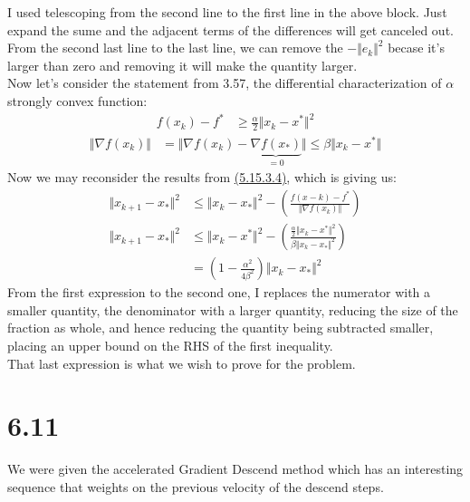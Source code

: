 \documentclass[]{article}
\begin{document}
    I used telescoping from the second line to the first line in the above block. Just expand the sume and the adjacent terms of the differences will get canceled out. 
    \\[1.1em]
    From the second last line to the last line, we can remove the $-\Vert e_k\Vert^2$ becase it's larger than zero and removing it will make the quantity larger. 
    \\[1.1em]
    Now let's consider the statement from 3.57, the differential characterization of $\alpha$ strongly convex function: 
    \begin{align*}\tag{5.15.3.5}\label{eqn:5.15.3.5}
        f(x_k) - f^* &\ge \frac{\alpha}{2}\Vert x_k - x^*\Vert^2
    \end{align*}
    \begin{align*}\tag{5.15.3.6}\label{eqn:5.15.3.6}
        \Vert \nabla f(x_k)\Vert &= 
        \Vert \nabla f(x_k) - \underbrace{\nabla f(x_*)}_{=0}\Vert \le \beta \Vert x_k - x^*\Vert
    \end{align*}
    Now we may reconsider the results from \hyperref[eqn:5.15.3.4]{(5.15.3.4)}, which is giving us: 
    \begin{align*}\tag{5.15.3.7}\label{eqn:5.15.3.7}
        \Vert x_{k + 1} - x_*\Vert^2 &\le 
        \Vert x_k - x_*\Vert^2 - 
        \left(
            \frac{f(x-k) - f^*}{\Vert \nabla f(x_k)\Vert}
        \right)
        \\
        \Vert x_{k + 1} - x_*\Vert^2 &\le 
        \Vert x_k - x^*\Vert^2 - 
        \left(
            \frac{\frac{\alpha}{2}\Vert x_k - x^*\Vert^2}{
                \beta \Vert x_k - x_*\Vert^2
            }
        \right)
        \\
        &= 
        \left(
            1 - \frac{\alpha^2}{4\beta^2}
        \right)\Vert x_k - x_*\Vert^2
    \end{align*}
    From the first expression to the second one, I replaces the numerator with a smaller quantity, the denominator with a larger quantity, reducing the size of the fraction as whole, and hence reducing the quantity being subtracted smaller, placing an upper bound on the RHS of the first inequality. 
    \\[1.1em]
    That last expression is what we wish to prove for the problem. 
\section*{6.11}
    We were given the accelerated Gradient Descend method which has an interesting sequence that weights on the previous velocity of the descend steps. 
\end{document}
